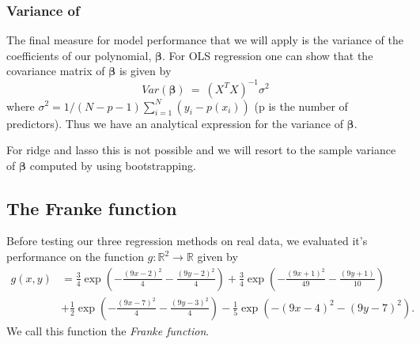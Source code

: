 \documentclass[a4paper,norsk]{article}
\begin{document}
\subsubsection{Variance of \bm{$\beta$}}
The final measure for model performance that we will apply is the variance 
of the coefficients of our polynomial, $\bm{\beta}$. For OLS regression
one can show that the covariance matrix of $\bm{\beta}$ is given by
\begin{equation}
    Var(\bm{\beta}) \ = \ (X^TX)^{-1} \sigma^2
\end{equation}
where $\sigma^2 = 1/(N - p - 1) \sum_{i=1}^N (y_i - p(x_i))$ 
(p is the number of predictors). Thus we have an analytical expression for 
the variance of $\bm{\beta}$.
\par
For ridge and lasso this is not possible and we will resort to the sample 
variance of $\bm{\beta}$ computed by using bootstrapping.

\subsection{The Franke function}
Before testing our three regression methods on real data, we evaluated it's
performance on the function $g: \mathbb{R}^2 \rightarrow \mathbb{R}$ 
given by
\begin{equation}
    \begin{split}
    g(x,y) &= \frac{3}{4}\exp{\left(-\frac{(9x-2)^2}{4} - \frac{(9y-2)^2}{4}\right)}+\frac{3}{4}\exp{\left(-\frac{(9x+1)^2}{49}- \frac{(9y+1)}{10}\right)} \\
&+\frac{1}{2}\exp{\left(-\frac{(9x-7)^2}{4} - \frac{(9y-3)^2}{4}\right)} -\frac{1}{5}\exp{\left(-(9x-4)^2 - (9y-7)^2\right) }.
    \end{split}
\end{equation}
We call this function the \textit{Franke function}.
\end{document}

